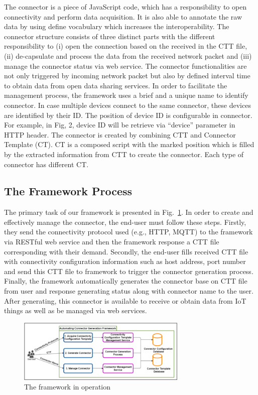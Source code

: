 The connector is a piece of JavaScript code, which has a responsibility to open connectivity and perform data acquisition. It is also able to annotate the raw data by using define vocabulary which increases the interoperability. The connector structure consists of three distinct parts with the different responsibility to (i) open the connection based on the received in the CTT file, (ii) de-capsulate and process the data from the received network packet and (iii) manage the connector status via web service. The connector functionalities are not only triggered by incoming network packet but also by defined interval time to obtain data from open data sharing services. In order to facilitate the management process, the framework uses a brief and a unique name to identify connector. In case multiple devices connect to the same connector, these devices are identified by their ID. The position of device ID is configurable in connector. For example, in Fig, 2, device ID will be retrieve via ``device'' parameter in HTTP header. The connector is created by combining CTT and Connector Template (CT). CT is a composed script with the marked position which is filled by the extracted information from CTT to create the connector. Each type of connector has different CT.

\subsection{The Framework Process}

The primary task of our framework is presented in Fig.~\ref{fig:c4_connector_general_operation}. In order to create and effectively manage the connector, the end-user must follow these steps. Firstly, they send the connectivity protocol used (e.g., HTTP, MQTT) to the framework via RESTful web service and then the framework response a CTT file corresponding with their demand. Secondly, the end-user fills received CTT file with connectivity configuration information such as host address, port number and send this CTT file to framework to trigger the connector generation process. Finally, the framework automatically generates the connector base on CTT file from user and response generating status along with connector name to the user. After generating, this connector is available to receive or obtain data from IoT things as well as be managed via web services.

\begin{figure}[h!] 
 \begin{center} 
 \includegraphics[width=0.72\textwidth]{./Part2/Chapter4/figures/connector_general_opereration.png} 
    \caption{The framework in operation}
     \label{fig:c4_connector_general_operation}
  \end{center} 
\end{figure}


